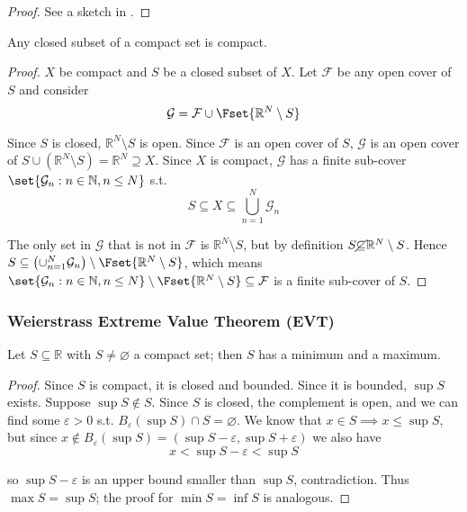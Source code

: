 \documentclass{article}
\begin{document}
\begin{proof}
  See a sketch in .
\end{proof}

\begin{theorem}\label{thm:lecture3_compactness_closed_compact}
  Any closed subset of a compact set is compact.
\end{theorem}

\begin{proof}
  $X$ be compact and $S$ be a closed subset of $X$. Let $\mathcal{F}$ be any open cover of $S$ and consider
  \[
    \mathcal{G} = \mathcal{F} \cup \Fset{\mathbb{R}^N \setminus S}
  \]

  Since $S$ is closed, $\mathbb{R}^N \setminus S$ is open. Since $\mathcal{F}$ is an open cover of $S$, $\mathcal{G}$ is an open cover of $S \cup (\mathbb{R}^N \setminus S) = \mathbb{R}^N \supseteq X$. Since $X$ is compact, $\mathcal{G}$ has a finite sub-cover $\set{\mathcal{G}_n: n \in \mathbb{N}, n \le N}$ s.t.
  \[
    S \subseteq X \subseteq \bigcup_{n = 1}^N \mathcal{G}_n
  \]

  The only set in $\mathcal{G}$ that is not in $\mathcal{F}$ is $\mathbb{R}^N \setminus S$, but by definition $S \cancel\subseteq \mathbb{R}^N \setminus S$. Hence $S \subseteq \left(\cup_{n = 1}^N \mathcal{G}_n\right) \setminus \Fset{\mathbb{R}^N \setminus S}$, which means $\set{\mathcal{G}_n: n \in \mathbb{N}, n \le N} \setminus \Fset{\mathbb{R}^N \setminus S} \subseteq \mathcal{F}$ is a finite sub-cover of $S$.
\end{proof}

\subsubsection{Weierstrass Extreme Value Theorem (EVT)}
\label{ssub:weierstrass_extreme_value_theorem_evt_}

\begin{theorem}
  Let $S \subseteq \mathbb{R}$ with $S \ne \varnothing$ a compact set; then $S$ has a minimum and a maximum.
\end{theorem}

\begin{proof}
  Since $S$ is compact, it is closed and bounded. Since it is bounded, $\sup S$ exists. Suppose $\sup S \notin S$.  Since $S$ is closed, the complement is open, and we can find some $\varepsilon > 0$ s.t. $B_\varepsilon(\sup S) \cap S = \varnothing$. We know that $x \in S \implies x \le \sup S$, but since $x \notin B_{\varepsilon}(\sup S) = (\sup S - \varepsilon, \sup S + \varepsilon)$ we also have
  \[
    x < \sup S - \varepsilon < \sup S
  \]

  so $\sup S - \varepsilon$ is an upper bound smaller than $\sup S$, contradiction. Thus $\max S = \sup S$; the proof for $\min S = \inf S$ is analogous.
\end{proof}
\end{document}

